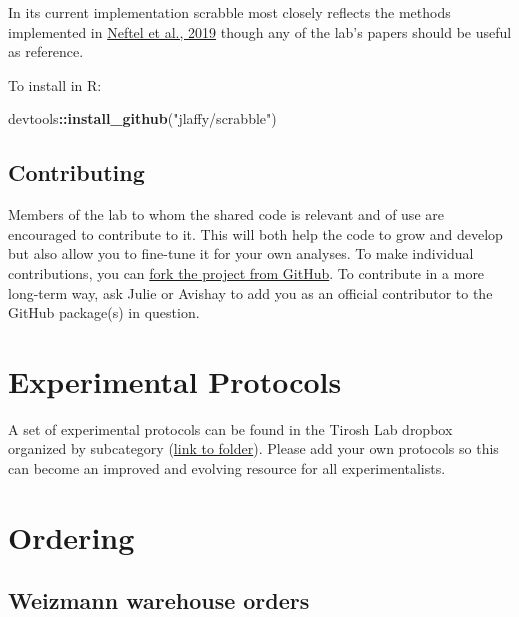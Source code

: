 \documentclass[]{book}
\newenvironment{Shaded}{\begin{snugshade}}{\end{snugshade}}
\newcommand{\KeywordTok}[1]{\textcolor[rgb]{0.13,0.29,0.53}{\textbf{#1}}}
\newcommand{\StringTok}[1]{\textcolor[rgb]{0.31,0.60,0.02}{#1}}
\newcommand{\OperatorTok}[1]{\textcolor[rgb]{0.81,0.36,0.00}{\textbf{#1}}}
\newcommand{\NormalTok}[1]{#1}
\begin{document}
In its current implementation scrabble most closely reflects the methods
implemented in
\href{https://www.ncbi.nlm.nih.gov/pubmed/31327527}{Neftel et al., 2019}
though any of the lab's papers should be useful as reference.

To install in R:

\begin{Shaded}
\begin{Highlighting}[]
\NormalTok{devtools}\OperatorTok{::}\KeywordTok{install_github}\NormalTok{(}\StringTok{"jlaffy/scrabble"}\NormalTok{)}
\end{Highlighting}
\end{Shaded}

\section{Contributing}\label{contributing}

Members of the lab to whom the shared code is relevant and of use are
encouraged to contribute to it. This will both help the code to grow and
develop but also allow you to fine-tune it for your own analyses. To
make individual contributions, you can
\href{https://help.github.com/en/github/getting-started-with-github/fork-a-repo}{fork
the project from GitHub}. To contribute in a more long-term way, ask
Julie or Avishay to add you as an official contributor to the GitHub
package(s) in question.

\chapter{Experimental Protocols}\label{protocols}

A set of experimental protocols can be found in the Tirosh Lab dropbox
organized by subcategory
(\href{https://www.dropbox.com/sh/javjoi26i5k5f6t/AADAX4RgSZUFuBwtS6TRE3wua?dl=0}{link
to folder}). Please add your own protocols so this can become an
improved and evolving resource for all experimentalists.

\chapter{Ordering}\label{ordering}

\section{Weizmann warehouse orders}\label{weizmann-warehouse-orders}
\end{document}
